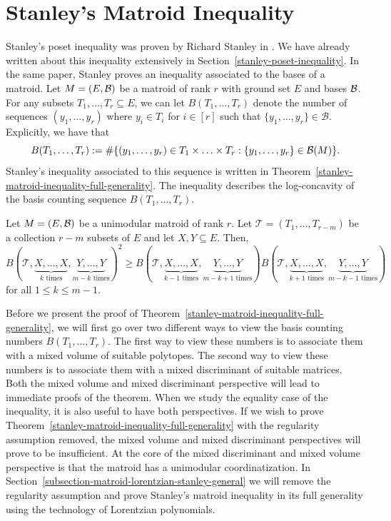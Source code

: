 \documentclass{puthesis-UG}
\begin{document}
\section{Stanley's Matroid Inequality} \label{sec:stanley-matroid-inequality}

Stanley's poset inequality was proven by Richard Stanley in \cite{STANLEY}. We have already written about this inequality extensively in Section~\ref{stanley-poset-inequality}. In the same paper, Stanley proves an inequality associated to the bases of a matroid. Let $M = (E, \mathcal{B})$ be a matroid of rank $r$ with ground set $E$ and bases $\mathcal{B}$. For any subsets $T_1, \ldots, T_r \subseteq E$, we can let $B(T_1, \ldots, T_r)$ denote the number of sequences $(y_1, \ldots, y_r)$ where $y_i \in T_i$ for $i \in [r]$ such that $\{y_1, \ldots, y_r\} \in \mathcal{B}$. Explicitly, we have that 
\[
	B(T_1, \ldots, T_r) := \# \{ (y_1, \ldots, y_r) \in T_1 \times \ldots \times T_r : \{y_1, \ldots, y_r\} \in \mathcal{B}(M) \}.
\]
Stanley's inequality associated to this sequence is written in Theorem~\ref{stanley-matroid-inequality-full-generality}. The inequality describes the log-concavity of the basis counting sequence $B(T_1, \ldots, T_r)$. 

\begin{thm} \label{stanley-matroid-inequality-full-generality}
	Let $M = (E, \mathcal{B})$ be a unimodular matroid of rank $r$. Let $\mathcal{T} = (T_1, \ldots, T_{r-m})$ be a collection $r-m$ subsets of $E$ and let $X, Y \subseteq E$. Then, 
	\[
		B(\mathcal{T}, \underbrace{X, \ldots, X}_{k \text{ times}}, \underbrace{Y, \ldots, Y}_{m-k \text{ times}})^2 \geq B(\mathcal{T}, \underbrace{X, \ldots, X}_{k-1 \text{ times}}, \underbrace{Y, \ldots, Y}_{m-k+1 \text{ times}}) B(\mathcal{T}, \underbrace{X, \ldots, X}_{k+1 \text{ times}}, \underbrace{Y, \ldots, Y}_{m-k-1 \text{ times}})
	\]
	for all $1 \leq k \leq m-1$. 
\end{thm}

Before we present the proof of Theorem~\ref{stanley-matroid-inequality-full-generality}, we will first go over two different ways to view the basis counting numbers $B(T_1, \ldots, T_r)$. The first way to view these numbers is to associate them with a mixed volume of suitable polytopes. The second way to view these numbers is to associate them with a mixed discriminant of suitable matrices. Both the mixed volume and mixed discriminant perspective will lead to immediate proofs of the theorem. When we study the equality case of the inequality, it is also useful to have both perspectives. If we wish to prove Theorem~\ref{stanley-matroid-inequality-full-generality} with the regularity assumption removed, the mixed volume and mixed discriminant perspectives will prove to be insufficient. At the core of the mixed discriminant and mixed volume perspective is that the matroid has a unimodular coordinatization. In Section~\ref{subsection-matroid-lorentzian-stanley-general} we will remove the regularity assumption and prove Stanley's matroid inequality in its full generality using the technology of Lorentzian polynomials.
\end{document}

